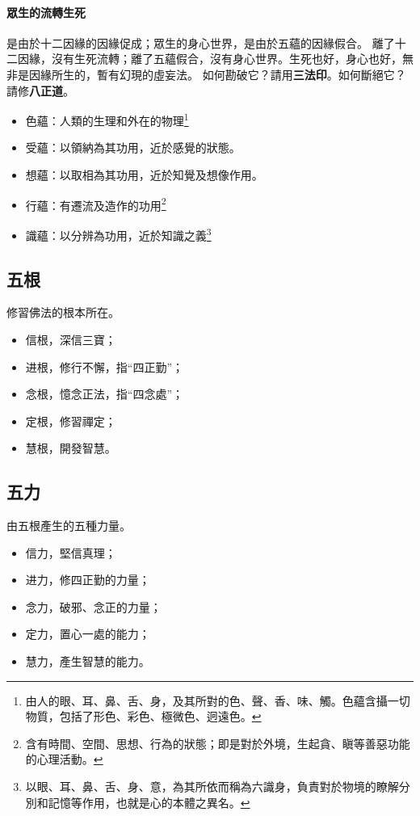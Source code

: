 \paragraph{眾生的流轉生死} 是由於十二因緣的因緣促成；眾生的身心世界，是由於五蘊的因緣假合。
離了十二因緣，沒有生死流轉；離了五蘊假合，沒有身心世界。生死也好，身心也好，無非是因緣所生的，暫有幻現的虛妄法。
如何勘破它？請用\textbf{三法印}。如何斷絕它？請修\textbf{八正道}。

\begin{itemize}
  \item 色蘊：人類的生理和外在的物理\footnote{由人的眼、耳、鼻、舌、身，及其所對的色、聲、香、味、觸。色蘊含攝一切物質，包括了形色、彩色、極微色、迥遠色。}
  \item 受蘊：以領納為其功用，近於感覺的狀態。
  \item 想蘊：以取相為其功用，近於知覺及想像作用。
  \item 行蘊：有遷流及造作的功用\footnote{含有時間、空間、思想、行為的狀態；即是對於外境，生起貪、瞋等善惡功能的心理活動。}
  \item 識蘊：以分辨為功用，近於知識之義\footnote{以眼、耳、鼻、舌、身、意，為其所依而稱為六識身，負責對於物境的瞭解分別和記憶等作用，也就是心的本體之異名。}
\end{itemize}


\subsection{五根}
修習佛法的根本所在。
\begin{itemize}
  \item 信根，深信三寶；
  \item 进根，修行不懈，指“四正勤”；
  \item 念根，憶念正法，指“四念處”；
  \item 定根，修習禪定；
  \item 慧根，開發智慧。
\end{itemize}

\subsection{五力}
由五根產生的五種力量。
\begin{itemize}
  \item 信力，堅信真理；
  \item 进力，修四正勤的力量；
  \item 念力，破邪、念正的力量；
  \item 定力，置心一處的能力；
  \item 慧力，產生智慧的能力。
\end{itemize}

